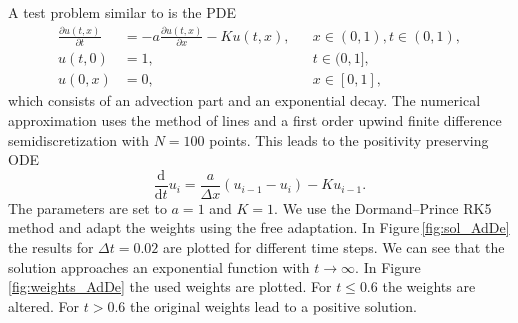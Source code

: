 \documentclass[a4paper]{article}
\numberwithin{equation}{section}
\theoremstyle{plain}
\theoremstyle{definition}
\numberwithin{theorem}{section}
\newcommand{\1}{\mathbbm{1}}
\begin{document}
A test problem similar to \cite{shampine_non-negative_2005} is the PDE
\begin{equation}
\label{eq:advection-decay}
\begin{aligned}
  \frac{\partial u(t,x)}{\partial t}
  &=
  -a \frac{\partial u(t,x)}{\partial x} - K u(t,x),
  && x \in (0, 1), t \in (0,1),
  \\
  u(t,0) &= 1,
  && t \in (0,1],
  \\
  u(0,x) &= 0,
  && x \in [0,1],
\end{aligned}
\end{equation}
which consists of an advection part and an exponential decay.
The numerical approximation uses the method of lines and a first order
upwind finite difference semidiscretization with $N = 100$ points.
This leads to the positivity preserving ODE
\begin{equation}
\frac{\mathrm d}{\mathrm d t} u_i = \frac{a}{\Delta x} \left( u_{i-1} - u_i \right) - K u_{i-1}.
\end{equation}
The parameters are set to $a=1$ and $K=1$.
We use the Dormand--Prince RK5 method and adapt the weights using the free adaptation.
In Figure\,\ref{fig:sol_AdDe} the results for $\Delta t = 0.02$ are plotted for different time steps. We can see that the solution approaches an exponential function with $t \rightarrow \infty$.
In Figure\,\ref{fig:weights_AdDe} the used weights are plotted. For $t\leq 0.6$ the weights are altered. For $t > 0.6$ the original weights lead to a positive solution.
\end{document}
